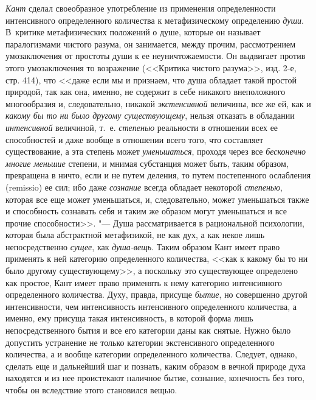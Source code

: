 {\em Кант} сделал своеобразное употребление из
применения определенности интенсивного определенного количества к
метафизическому определению {\em души}. В~критике
метафизических положений о душе, которые он называет паралогизмами чистого
разума, он занимается, между прочим, рассмотрением умозаключения от
простоты души к ее неуничтожаемости. Он выдвигает против этого
умозаключения то возражение (<<Критика чистого разума>>, изд. 2-е, стр. 414),
что <<даже если мы и признаем, что душа обладает такой простой природой, так
как она, именно, не содержит в себе никакого внеположного многообразия и,
следовательно, никакой {\em экстенсивной} величины, все
же ей, как и {\em какому бы то ни было другому
существующему}, нельзя отказать в обладании
{\em интенсивной} величиной, т.~е.
{\em степенью} реальности в отношении всех ее
способностей и даже вообще в отношении всего того, что составляет
существование, а эта степень может {\em уменьшаться},
проходя через все {\em бесконечно многие меньшие}
степени, и мнимая субстанция может быть, таким образом, превращена в ничто,
если и не путем деления, то путем постепенного ослабления (remissio) ее
сил; ибо даже {\em сознание} всегда обладает некоторой
{\em степенью}, которая все еще может уменьшаться, и,
следовательно, может уменьшаться также и способность сознавать себя и таким
же образом могут уменьшаться и все прочие способности>>. "--- Душа
рассматривается в рациональной психологии, которая была абстрактной
метафизикой, не как дух, а как некое лишь непосредственно
{\em сущее}, как {\em душа-вещь}.
Таким образом Кант имеет право применять к ней категорию определенного
количества, <<как к какому бы то ни было другому существующему>>, а поскольку
это существующее определено как простое, Кант имеет право применять к нему
категорию интенсивного определенного количества. Духу, правда, присуще
{\em бытие}, но совершенно другой интенсивности, чем
интенсивность интенсивного определенного количества, а именно, ему присуща
такая интенсивность, в которой форма лишь непосредственного бытия и все его
категории даны как снятые. Нужно было допустить устранение не только
категории экстенсивного определенного количества, а и вообще категории
определенного количества. Следует, однако, сделать еще и дальнейший шаг и
познать, каким образом в вечной природе духа находятся и из нее проистекают
наличное бытие, сознание, конечность без того, чтобы он вследствие этого
становился вещью.

